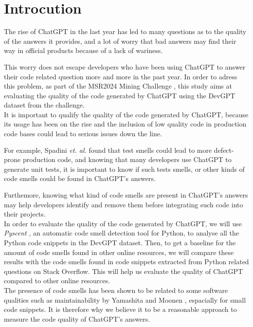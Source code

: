 \section{Introcution}
\label{sec:introduction}
The rise of ChatGPT in the last year has led to many questions as to the quality of the answers it provides, and a lot of worry that bad answers may find their way in official products because of a lack of wariness.

This worry does not escape developers who have been using ChatGPT to answer their code related question more and more in the past year. In order to adress this problem, as part of the MSR2024 Mining Challenge \cite{msr-2024}, this study aims at evaluating the quality of the code generated by ChatGPT using the DevGPT dataset from the challenge. \\

It is important to qualify the quality of the code generated by ChatGPT, because its usage has been on the rise and the inclusion of low quality code in production code bases could lead to serious issues down the line.

For example, Spadini \textit{et. al.} \cite{spadini-2018} found that test smells could lead to more defect-prone production code, and knowing that many developers use ChatGPT to generate unit tests, it is important to know if such tests smells, or other kinds of code smells could be found in ChatGPT's answers.

Furthemore, knowing what kind of code smells are present in ChatGPT's answers may help developers identify and remove them before integrating such code into their projects. \\

In order to evaluate the quality of the code generated by ChatGPT, we will use \textit{Pyscent} , an automatic code smell detection tool for Python, to analyse all the Python code snippets in the DevGPT dataset. Then, to get a baseline for the amount of code smells found in other online resources, we will compare these results with the code smells found in code snippets extracted from Python related questions on Stack Overflow. This will help us evaluate the quality of ChatGPT compared to other online resources. \\

The presence of code smells has been shown to be related to some software qualities such as maintainability by Yamashita and Moonen \cite{yamashita-2012}, espacially for small code snippets. It is therefore why we believe it to be a reasonable approach to measure the code quality of ChatGPT's answers.\\

